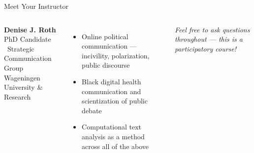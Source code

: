 \documentclass[aspectratio=169]{beamer}
\begin{document}
\begin{frame}{Meet Your Instructor}
\vspace{0.2cm}
\begin{columns}[c]

    {\large\textbf{Denise J. Roth}}\\[2pt]
    {\small\textcolor{midgray}{PhD Candidate \textperiodcentered\
     Strategic Communication Group\\
     Wageningen University \& Research}}

    \bigskip
    \begin{itemize}\setlength\itemsep{6pt}
      \item[\textcolor{wurgreen}{\faCompass}]
        Online political communication --- incivility, polarization, public discourse
      \item[\textcolor{wurgreen}{\faSearch}]
        Black digital health communication and scientization of public debate
      \item[\textcolor{wurgreen}{\faPython}]
        Computational text analysis as a method across all of the above
    \end{itemize}

    \bigskip
    {\small\textit{\textcolor{midgray}{Feel free to ask questions throughout --- this is a participatory course!}}}
\end{columns}
\end{frame}
\end{document}
